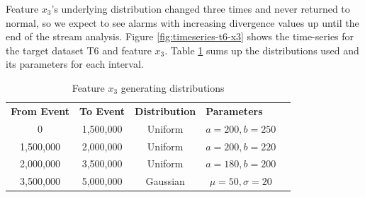 \documentclass[sigconf]{acmart}
\begin{document}
Feature $x_3$'s underlying distribution changed three times and never returned to normal, so we expect to see alarms with increasing divergence values up until the end of the stream analysis. Figure \ref{fig:timeseries-t6-x3} shows the time-series for the target dataset T6 and feature $x_3$. Table \ref{tbl:multi-feat-x3-changes} sums up the distributions used and its parameters for each interval.
\begin{table}[!htb]
    \begin{center}
    \begin{tabular}{|c|c|c|c|l}
    \cline{1-4}
    \textbf{From Event} & \textbf{To Event} & \textbf{Distribution} & \multicolumn{1}{l|}{\textbf{Parameters}} &  \\ \cline{1-4}
    0                   & 1,500,000         & Uniform               & $a=200, b=250$                           &  \\ \cline{1-4}
    1,500,000           & 2,000,000         & Uniform               & $a=200, b=220$                           &  \\ \cline{1-4}
    2,000,000            & 3,500,000         & Uniform               & $a=180, b=200$                           &  \\ \cline{1-4}
    3,500,000           & 5,000,000         & Gaussian              & $\mu=50, \sigma=20$                      &  \\ \cline{1-4}
    \end{tabular}
    \end{center}
    \caption{Feature $x_3$ generating distributions}
    \label{tbl:multi-feat-x3-changes}
\end{table}
\end{document}

